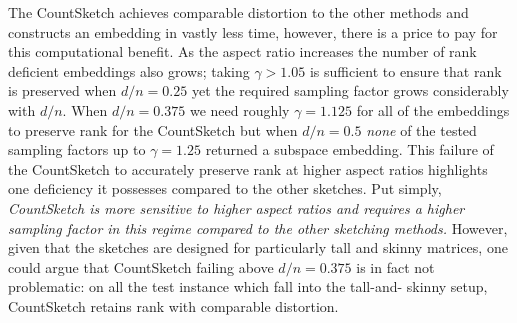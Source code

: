 The CountSketch achieves comparable distortion to the other methods and constructs
an embedding in vastly less time, however, there is a price to pay for this
computational benefit.
As the aspect ratio increases the number of rank deficient embeddings also
grows; taking $\gamma > 1.05$ is sufficient to ensure that rank is preserved
when $d/n=0.25$ yet the required sampling factor grows considerably with $d/n$.
When $d/n=0.375$ we need roughly $\gamma = 1.125$ for all of the embeddings to
preserve rank for the CountSketch but when $d/n = 0.5$ \textit{none} of the
tested sampling factors up to $\gamma=1.25$ returned a subspace embedding.
This failure of the CountSketch to accurately preserve rank at higher aspect
ratios highlights one deficiency it possesses compared to the other sketches.
Put simply, \textit{CountSketch is more sensitive to higher aspect ratios and
requires a higher sampling factor in this regime compared to the other
sketching methods.}
However, given that the sketches are designed for particularly tall and skinny
matrices, one could argue that CountSketch failing above $d/n = 0.375$ is in
fact not problematic: on all the test instance which fall into the tall-and-
skinny setup, CountSketch retains rank with comparable distortion.

